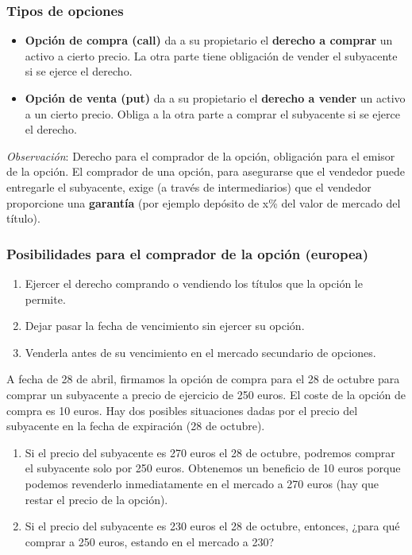 \documentclass[
10pt, %
a4paper, %
oneside, %
headinclude,footinclude, %
BCOR5mm, %
]{scrartcl}
\newcommand{\n}[1]{\textbf{#1}}
\newcommand{\cur}[1]{\textit{#1}}
\newcommand{\verde}{\color{verde}}
\newcounter{ex}
\newcommand{\ejemplo}{\vspace{0.4cm} {\verde{Ejemplo \arabic{ex}.}}\addtocounter{ex}{1} }
\newcounter{prop}
\begin{document}
		\subsubsection{Tipos de opciones}
		\begin{itemize}
			\item \n{Opción de compra (call)} da a su propietario el \n{derecho a comprar} un activo a cierto precio. La otra parte tiene obligación de vender el subyacente si se ejerce el derecho. %
			\item \n{Opción de venta (put)} da a su propietario el \n{derecho a vender} un activo a un cierto precio. Obliga a la otra parte a comprar el subyacente si se ejerce el derecho.
		\end{itemize}

		\cur{Observación}: Derecho para el comprador de la opción, obligación para el emisor de la opción. El comprador de una opción, para asegurarse que el vendedor puede entregarle el subyacente, exige (a través de intermediarios) que el vendedor proporcione una \n{garantía} (por ejemplo depósito de x\% del valor de mercado del título).

		\vspace{-0.3cm}

		\subsubsection{Posibilidades para el comprador de la opción (europea)}

		\begin{enumerate}
			\item Ejercer el derecho comprando o vendiendo los títulos que la opción le permite.
			\item Dejar pasar la fecha de vencimiento sin ejercer su opción.
			\item Venderla antes de su vencimiento en el mercado secundario de opciones.
		\end{enumerate}

		\ejemplo A fecha de 28 de abril, firmamos la opción de compra para el 28 de octubre para comprar un subyacente a precio de ejercicio de 250 euros. El coste de la opción de compra es 10 euros. Hay dos posibles situaciones dadas por el precio del subyacente en la fecha de expiración (28 de octubre).
		\begin{enumerate}
			\item Si el precio del subyacente es 270 euros el 28 de octubre, podremos comprar el subyacente solo por 250 euros. Obtenemos un beneficio de 10 euros porque podemos revenderlo inmediatamente en el mercado a 270 euros (hay que restar el precio de la opción).
			\item Si el precio del subyacente es 230 euros el 28 de octubre, entonces, ¿para qué comprar a 250 euros, estando en el mercado a 230?
		\end{enumerate}
\end{document}

